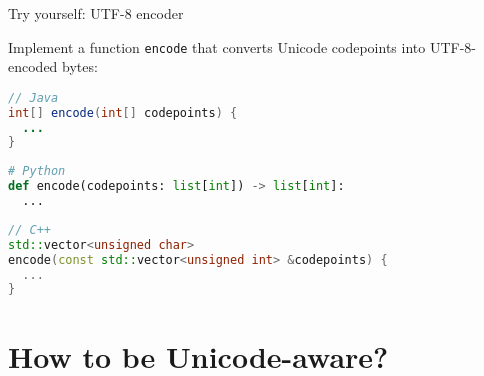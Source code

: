 \documentclass[../index.tex]{subfiles}
\begin{document}
\renewcommand{\currenttitle}{Try yourself: UTF-8 encoder}
\begin{frame}[fragile]{\currenttitle}
%
  \vspace*{1em}

  Implement a function \texttt{encode} that converts Unicode codepoints into UTF-8-encoded
  bytes: \\[1em]

  \begin{lstlisting}[language=Java]
// Java
int[] encode(int[] codepoints) {
  ...
}
  \end{lstlisting}

  \begin{lstlisting}[language=Python]
# Python
def encode(codepoints: list[int]) -> list[int]:
  ...
  \end{lstlisting}

  \begin{lstlisting}[language=C++]
// C++
std::vector<unsigned char>
encode(const std::vector<unsigned int> &codepoints) {
  ...
}
  \end{lstlisting}
\end{frame}

\renewcommand{\sectiontitle}{How to be Unicode-aware?}
\section{\sectiontitle}
\end{document}
